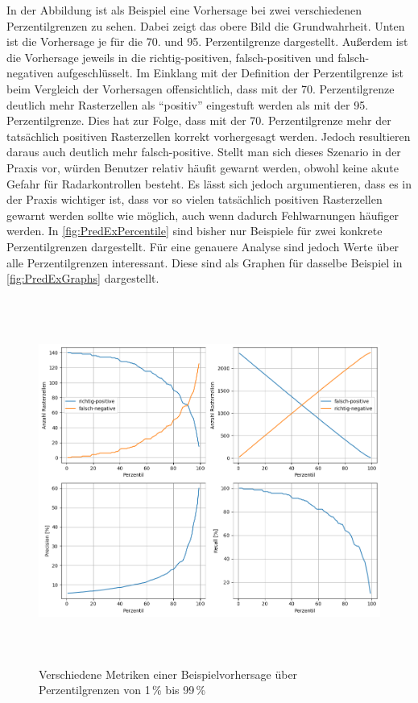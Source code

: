 In der Abbildung ist als Beispiel eine Vorhersage bei zwei verschiedenen Perzentilgrenzen zu sehen.
Dabei zeigt das obere Bild die Grundwahrheit.
Unten ist die Vorhersage je für die 70. und 95. Perzentilgrenze dargestellt.
Außerdem ist die Vorhersage jeweils in die richtig-positiven, falsch-positiven und falsch-negativen aufgeschlüsselt.
Im Einklang mit der Definition der Perzentilgrenze ist beim Vergleich der Vorhersagen offensichtlich, dass mit der 70. Perzentilgrenze deutlich mehr Rasterzellen als "`positiv"' eingestuft werden als mit der 95. Perzentilgrenze.
Dies hat zur Folge, dass mit der 70. Perzentilgrenze mehr der tatsächlich positiven Rasterzellen korrekt vorhergesagt werden.
Jedoch resultieren daraus auch deutlich mehr falsch-positive.
Stellt man sich dieses Szenario in der Praxis vor, würden Benutzer relativ häufit gewarnt werden, obwohl keine akute Gefahr für Radarkontrollen besteht.
Es lässt sich jedoch argumentieren, dass es in der Praxis wichtiger ist, dass vor so vielen tatsächlich positiven Rasterzellen gewarnt werden sollte wie möglich, auch wenn dadurch Fehlwarnungen häufiger werden.
In \autoref{fig:PredExPercentile} sind bisher nur Beispiele für zwei konkrete Perzentilgrenzen dargestellt.
Für eine genauere Analyse sind jedoch Werte über alle Perzentilgrenzen interessant.
Diese sind als Graphen für dasselbe Beispiel in \autoref{fig:PredExGraphs} dargestellt.

\begin{figure}[h]
    \centering
    \includegraphics[width=1.0\textwidth,height=12cm,keepaspectratio=true]{content/images/PredExGraphs.png}
    \caption{Verschiedene Metriken einer Beispielvorhersage über Perzentilgrenzen von 1\,\% bis 99\,\%}
    \label{fig:PredExGraphs}
\end{figure}


